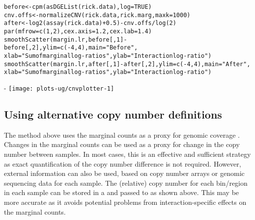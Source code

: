 \documentclass{report}\usepackage[]{graphicx}\usepackage[usenames,dvipsnames]{color}
\makeatletter
\def\maxwidth{ %
  \ifdim\Gin@nat@width>\linewidth
    \linewidth
  \else
    \Gin@nat@width
  \fi
}
\newcommand{\hlnum}[1]{\textcolor[rgb]{0.816,0.125,0.439}{#1}}%
\newcommand{\hlstr}[1]{\textcolor[rgb]{0.251,0.627,0.251}{#1}}%
\newcommand{\hlopt}[1]{\textcolor[rgb]{0,0,0}{#1}}%
\newcommand{\hlstd}[1]{\textcolor[rgb]{0.251,0.251,0.251}{#1}}%
\newcommand{\hlkwb}[1]{\textcolor[rgb]{0,0,0}{#1}}%
\newcommand{\hlkwc}[1]{\textcolor[rgb]{0.251,0.251,0.251}{#1}}%
\newcommand{\hlkwd}[1]{\textcolor[rgb]{0.878,0.439,0.125}{#1}}%
\newenvironment{knitrout}{}{} %
\makeatother
\begin{document}
\begin{knitrout}
\color{fgcolor}\begin{kframe}
\begin{alltt}
\hlstd{before} \hlkwb{<-} \hlkwd{cpm}\hlstd{(}\hlkwd{asDGEList}\hlstd{(rick.data),} \hlkwc{log}\hlstd{=}\hlnum{TRUE}\hlstd{)}
\hlstd{cnv.offs} \hlkwb{<-} \hlkwd{normalizeCNV}\hlstd{(rick.data, rick.marg,} \hlkwc{maxk}\hlstd{=}\hlnum{1000}\hlstd{)}
\hlstd{after} \hlkwb{<-} \hlkwd{log2}\hlstd{(}\hlkwd{assay}\hlstd{(rick.data)}\hlopt{+}\hlnum{0.5}\hlstd{)} \hlopt{-} \hlstd{cnv.offs}\hlopt{/}\hlkwd{log}\hlstd{(}\hlnum{2}\hlstd{)}
\hlkwd{par}\hlstd{(}\hlkwc{mfrow}\hlstd{=}\hlkwd{c}\hlstd{(}\hlnum{1}\hlstd{,}\hlnum{2}\hlstd{),} \hlkwc{cex.axis}\hlstd{=}\hlnum{1.2}\hlstd{,} \hlkwc{cex.lab}\hlstd{=}\hlnum{1.4}\hlstd{)}
\hlkwd{smoothScatter}\hlstd{(margin.lr, before[,}\hlnum{1}\hlstd{]}\hlopt{-}\hlstd{before[,}\hlnum{2}\hlstd{],} \hlkwc{ylim}\hlstd{=}\hlkwd{c}\hlstd{(}\hlopt{-}\hlnum{4}\hlstd{,} \hlnum{4}\hlstd{),} \hlkwc{main}\hlstd{=}\hlstr{"Before"}\hlstd{,}
    \hlkwc{xlab}\hlstd{=}\hlstr{"Sum of marginal log-ratios"}\hlstd{,} \hlkwc{ylab}\hlstd{=}\hlstr{"Interaction log-ratio"}\hlstd{)}
\hlkwd{smoothScatter}\hlstd{(margin.lr, after[,}\hlnum{1}\hlstd{]}\hlopt{-}\hlstd{after[,}\hlnum{2}\hlstd{],} \hlkwc{ylim}\hlstd{=}\hlkwd{c}\hlstd{(}\hlopt{-}\hlnum{4}\hlstd{,} \hlnum{4}\hlstd{),} \hlkwc{main}\hlstd{=}\hlstr{"After"}\hlstd{,}
    \hlkwc{xlab}\hlstd{=}\hlstr{"Sum of marginal log-ratios"}\hlstd{,} \hlkwc{ylab}\hlstd{=}\hlstr{"Interaction log-ratio"}\hlstd{)}
\end{alltt}
\end{kframe}\begin{adjustwidth}{0mm}{-\fltoffset}
\texttt{[image: plots-ug/cnvplotter-1]} \end{adjustwidth}
\end{knitrout}

\subsection{Using alternative copy number definitions}
The method above uses the marginal counts as a proxy for genomic coverage \cite{imakaev2012iterative}.
Changes in the marginal counts can be used as a proxy for change in the copy number between samples.     
In most cases, this is an effective and sufficient strategy as exact quantification of the copy number difference is not required.
However, external information can also be used, based on copy number arrays or genomic sequencing data for each sample.
The (relative) copy number for each bin/region in each sample can be stored in a  and passed to  as shown above.
This may be more accurate as it avoids potential problems from interaction-specific effects on the marginal counts.
\end{document}
